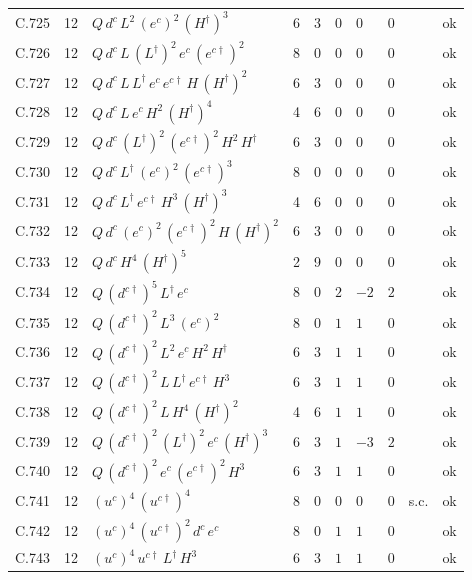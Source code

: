 {\begin{longtable}{@{}ll>{\raggedright\arraybackslash}p{6.4cm}rrllllr@{}}
C.725 & 12 & $Q\,d^c\,L^{2}\,(e^c)^{2}\,(H^\dagger)^{3}$ & 6 & 3 & $0$ & $0$ & $0$ &  & ok \\
C.726 & 12 & $Q\,d^c\,L\,(L^\dagger)^{2}\,e^c\,(e^{c\dagger})^{2}$ & 8 & 0 & $0$ & $0$ & $0$ &  & ok \\
C.727 & 12 & $Q\,d^c\,L\,L^\dagger\,e^c\,e^{c\dagger}\,H\,(H^\dagger)^{2}$ & 6 & 3 & $0$ & $0$ & $0$ &  & ok \\
C.728 & 12 & $Q\,d^c\,L\,e^c\,H^{2}\,(H^\dagger)^{4}$ & 4 & 6 & $0$ & $0$ & $0$ &  & ok \\
C.729 & 12 & $Q\,d^c\,(L^\dagger)^{2}\,(e^{c\dagger})^{2}\,H^{2}\,H^\dagger$ & 6 & 3 & $0$ & $0$ & $0$ &  & ok \\
C.730 & 12 & $Q\,d^c\,L^\dagger\,(e^c)^{2}\,(e^{c\dagger})^{3}$ & 8 & 0 & $0$ & $0$ & $0$ &  & ok \\
C.731 & 12 & $Q\,d^c\,L^\dagger\,e^{c\dagger}\,H^{3}\,(H^\dagger)^{3}$ & 4 & 6 & $0$ & $0$ & $0$ &  & ok \\
C.732 & 12 & $Q\,d^c\,(e^c)^{2}\,(e^{c\dagger})^{2}\,H\,(H^\dagger)^{2}$ & 6 & 3 & $0$ & $0$ & $0$ &  & ok \\
C.733 & 12 & $Q\,d^c\,H^{4}\,(H^\dagger)^{5}$ & 2 & 9 & $0$ & $0$ & $0$ &  & ok \\
C.734 & 12 & $Q\,(d^{c\dagger})^{5}\,L^\dagger\,e^c$ & 8 & 0 & $2$ & $-2$ & $2$ &  & ok \\
C.735 & 12 & $Q\,(d^{c\dagger})^{2}\,L^{3}\,(e^c)^{2}$ & 8 & 0 & $1$ & $1$ & $0$ &  & ok \\
C.736 & 12 & $Q\,(d^{c\dagger})^{2}\,L^{2}\,e^c\,H^{2}\,H^\dagger$ & 6 & 3 & $1$ & $1$ & $0$ &  & ok \\
C.737 & 12 & $Q\,(d^{c\dagger})^{2}\,L\,L^\dagger\,e^{c\dagger}\,H^{3}$ & 6 & 3 & $1$ & $1$ & $0$ &  & ok \\
C.738 & 12 & $Q\,(d^{c\dagger})^{2}\,L\,H^{4}\,(H^\dagger)^{2}$ & 4 & 6 & $1$ & $1$ & $0$ &  & ok \\
C.739 & 12 & $Q\,(d^{c\dagger})^{2}\,(L^\dagger)^{2}\,e^c\,(H^\dagger)^{3}$ & 6 & 3 & $1$ & $-3$ & $2$ &  & ok \\
C.740 & 12 & $Q\,(d^{c\dagger})^{2}\,e^c\,(e^{c\dagger})^{2}\,H^{3}$ & 6 & 3 & $1$ & $1$ & $0$ &  & ok \\
C.741 & 12 & $(u^c)^{4}\,(u^{c\dagger})^{4}$ & 8 & 0 & $0$ & $0$ & $0$ & s.c. & ok \\
C.742 & 12 & $(u^c)^{4}\,(u^{c\dagger})^{2}\,d^c\,e^c$ & 8 & 0 & $1$ & $1$ & $0$ &  & ok \\
C.743 & 12 & $(u^c)^{4}\,u^{c\dagger}\,L^\dagger\,H^{3}$ & 6 & 3 & $1$ & $1$ & $0$ &  & ok \\

\end{longtable}}
